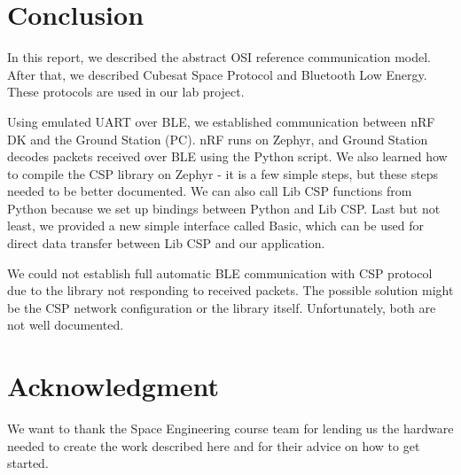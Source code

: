 \documentclass[conference]{IEEEtran}
\begin{document}
\newpage
\section{Conclusion}
In this report, we described the abstract OSI reference communication model. After that, we described Cubesat Space Protocol and Bluetooth Low Energy. These protocols are used in our lab project. 

Using emulated UART over BLE, we established communication between nRF DK and the Ground Station (PC). nRF runs on Zephyr, and Ground Station decodes packets received over BLE using the Python script. We also learned how to compile the CSP library on Zephyr - it is a few simple steps, but these steps needed to be better documented. We can also call Lib CSP functions from Python because we set up bindings between Python and Lib CSP. Last but not least, we provided a new simple interface called Basic, which can be used for direct data transfer between Lib CSP and our application.

We could not establish full automatic BLE communication with CSP protocol due to the library not responding to received packets. The possible solution might be the CSP network configuration or the library itself. Unfortunately, both are not well documented. 

\section*{Acknowledgment}
We want to thank the Space Engineering course team for lending us the hardware needed to create the work described here and for their advice on how to get started.



\end{document}
